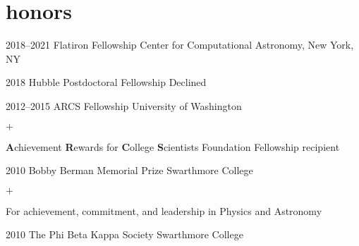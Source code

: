 \documentclass[]{luger-cv} %
\begin{document}


\section{honors}

\begin{entrylist}

\entry
{2018--2021}
{Flatiron Fellowship}
{Center for Computational Astronomy, New York, NY}
{%
}


\entry
{2018}
{Hubble Postdoctoral Fellowship}
{Declined}
{%
}


\entry
{2012--2015}
{ARCS Fellowship}
{University of Washington}
{%
\vspace{-1em}
\begin{list}{$+$}{\cvlist}
\item \textbf{A}chievement \textbf{R}ewards for \textbf{C}ollege \textbf{S}cientists
Foundation Fellowship recipient
\end{list}
}


\entry
{2010}
{Bobby Berman Memorial Prize}
{Swarthmore College}
{%
\vspace{-1em}
\begin{list}{$+$}{\cvlist}
\item For achievement, commitment, and
leadership in Physics and Astronomy
\end{list}
}


\ifdefined \onepage \else
\entry
{2010}
{The Phi Beta Kappa Society}
{Swarthmore College}
{}
\fi


\end{entrylist}

\end{document}
